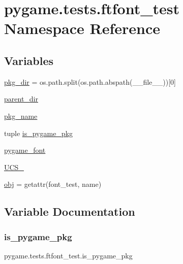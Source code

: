 \hypertarget{namespacepygame_1_1tests_1_1ftfont__test}{}\section{pygame.\+tests.\+ftfont\+\_\+test Namespace Reference}
\label{namespacepygame_1_1tests_1_1ftfont__test}
\subsection*{Variables}
\begin{DoxyCompactItemize}
\item 
\hyperlink{namespacepygame_1_1tests_1_1ftfont__test_adba41a504b406a67ae8ebd9aac8588f2}{pkg\+\_\+dir} = os.\+path.\+split(os.\+path.\+abspath(\+\_\+\+\_\+file\+\_\+\+\_\+))\mbox{[}0\mbox{]}
\item 
\hyperlink{namespacepygame_1_1tests_1_1ftfont__test_ac973ca4bfca5314d2163a0f4560c5b7b}{parent\+\_\+dir}
\item 
\hyperlink{namespacepygame_1_1tests_1_1ftfont__test_a422b9713c6317aa2125fdfa0d2eb6a5e}{pkg\+\_\+name}
\item 
tuple \hyperlink{namespacepygame_1_1tests_1_1ftfont__test_a1f93e7c7b3b49e553ae4e10574d7a479}{is\+\_\+pygame\+\_\+pkg}
\item 
\hyperlink{namespacepygame_1_1tests_1_1ftfont__test_a6faa4bd6272f63ee0b69c93b993039c4}{pygame\+\_\+font}
\item 
\hyperlink{namespacepygame_1_1tests_1_1ftfont__test_aa40d2b8f7e9426753cf86330fb926855}{U\+C\+S\+\_}
\item 
\hyperlink{namespacepygame_1_1tests_1_1ftfont__test_a527712a9a43e79370f230b43f63092ab}{obj} = getattr(font\+\_\+test, name)
\end{DoxyCompactItemize}


\subsection{Variable Documentation}
\mbox{\label{namespacepygame_1_1tests_1_1ftfont__test_a1f93e7c7b3b49e553ae4e10574d7a479}} 
\subsubsection{\texorpdfstring{is\+\_\+pygame\+\_\+pkg}{is\_pygame\_pkg}}
{\footnotesize\ttfamily pygame.\+tests.\+ftfont\+\_\+test.\+is\+\_\+pygame\+\_\+pkg}

